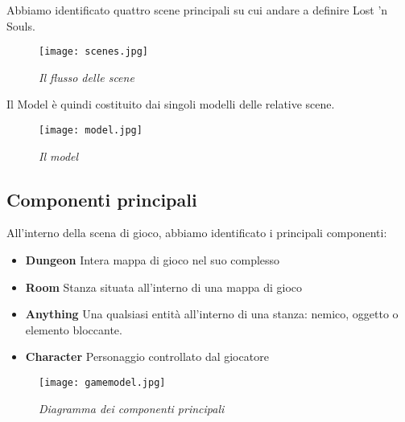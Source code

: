Abbiamo identificato quattro scene principali su cui andare a definire Lost 'n Souls. 


\begin{figure}[!hbt]
    \centering
    \texttt{[image: scenes.jpg]}
    \caption{\textit{Il flusso delle scene}}
\end{figure}

Il Model è quindi costituito dai singoli modelli delle relative scene.


\begin{figure}[!hbt]
    \centering
    \texttt{[image: model.jpg]}
    \caption{\textit{Il model}} 
\end{figure}

\newpage 
\subsection{Componenti principali}
All'interno della scena di gioco, abbiamo identificato i principali componenti:


\begin{itemize}
    \item \textbf{Dungeon} Intera mappa di gioco nel suo complesso
    \item \textbf{Room} Stanza situata all'interno di una mappa di gioco
    \item \textbf{Anything} Una qualsiasi entità all'interno di una stanza: nemico, oggetto o elemento bloccante. 
    \item \textbf{Character} Personaggio controllato dal giocatore
\end{itemize}


\begin{figure}[!hbt]
    \centering
    \texttt{[image: gamemodel.jpg]}
    \caption{\textit{Diagramma dei componenti principali}} 
\end{figure}